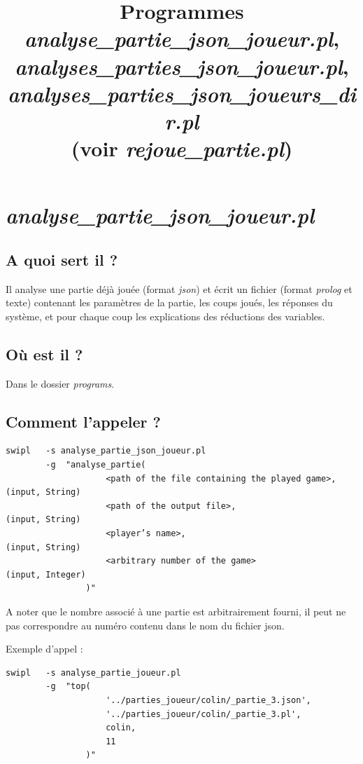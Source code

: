 \documentclass[a4paper,12pt]{article}
\begin{document}
\title{Programmes \\
		\emph{analyse\_partie\_json\_joueur.pl}, \\
		 \emph{analyses\_parties\_json\_joueur.pl}, \\
		  \emph{analyses\_parties\_json\_joueurs\_dir.pl} \\
		  (voir \emph{rejoue\_partie.pl})}
\date{}
\maketitle

\section{\emph{analyse\_partie\_json\_joueur.pl}}

\subsection*{A quoi sert il ?}
Il analyse une partie déjà jouée (format \emph{json}) et écrit un fichier (format \emph{prolog} et texte) contenant les paramètres de la partie, les coups joués,  les réponses du système, et pour chaque coup les explications des réductions des variables.

\subsection*{Où est il ?}
	Dans le dossier \emph{programs}.
	
\subsection*{Comment l’appeler ?}
	
\begin{Verbatim}
swipl	-s analyse_partie_json_joueur.pl
		-g  "analyse_partie(
					<path of the file containing the played game>, 	(input, String)
					<path of the output file>, 							(input, String)
					<player’s name>,											(input, String)
					<arbitrary number of the game>						(input, Integer)
				)"
\end{Verbatim}

A noter que le nombre associé à une partie est arbitrairement fourni, il peut ne pas correspondre au numéro contenu
dans le nom du fichier json.

Exemple d’appel :
\begin{Verbatim}
swipl	-s analyse_partie_joueur.pl 
		-g  "top(
					'../parties_joueur/colin/_partie_3.json', 
					'../parties_joueur/colin/_partie_3.pl',
					colin,
					11
				)"
\end{Verbatim}
\end{document}
